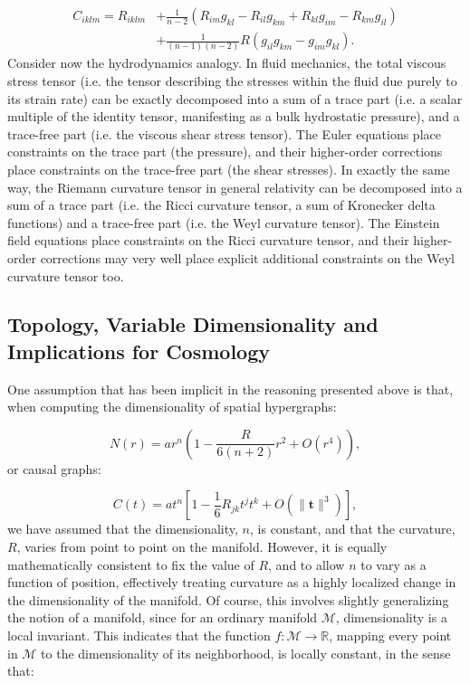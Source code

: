\documentclass{article}
\begin{document}
\begin{align}
C_{i k l m} = R_{i k l m} &+ \frac{1}{n - 2} \left( R_{i m} g_{k l} - R_{i l} g_{k m} + R_{k l} g_{i m} - R_{k m} g_{i l} \right)\\
&+ \frac{1}{\left( n - 1 \right) \left( n - 2 \right)} R \left( g_{i l} g_{k m} - g_{i m} g_{k l} \right).
\end{align}
Consider now the hydrodynamics analogy. In fluid mechanics, the total viscous stress tensor (i.e. the tensor describing the stresses within the fluid due purely to its strain rate) can be exactly decomposed into a sum of a trace part (i.e. a scalar multiple of the identity tensor, manifesting as a bulk hydrostatic pressure), and a trace-free part (i.e. the viscous shear stress tensor). The Euler equations place constraints on the trace part (the pressure), and their higher-order corrections place constraints on the trace-free part (the shear stresses). In exactly the same way, the Riemann curvature tensor in general relativity can be decomposed into a sum of a trace part (i.e. the Ricci curvature tensor, a sum of Kronecker delta functions) and a trace-free part (i.e. the Weyl curvature tensor). The Einstein field equations place constraints on the Ricci curvature tensor, and their higher-order corrections may very well place explicit additional constraints on the Weyl curvature tensor too.

\subsection{Topology, Variable Dimensionality and Implications for Cosmology}
\label{sec:CurrentStatus8}

One assumption that has been implicit in the reasoning presented above is that, when computing the dimensionality of spatial hypergraphs:

\begin{equation}
N \left( r \right) = a r^n \left( 1 - \frac{R}{6 \left( n + 2 \right)} r^2 + O \left( r^4 \right) \right),
\end{equation}
or causal graphs:

\begin{equation}
C \left( t \right) = a t ^n \left[ 1 - \frac{1}{6} R_{j k} t^j t^k + O \left( \lVert \mathbf{t} \rVert^3 \right) \right],
\end{equation}
we have assumed that the dimensionality, $n$, is constant, and that the curvature, $R$, varies from point to point on the manifold. However, it is equally mathematically consistent to fix the value of $R$, and to allow $n$ to vary as a function of position, effectively treating curvature as a highly localized change in the dimensionality of the manifold. Of course, this involves slightly generalizing the notion of a manifold, since for an ordinary manifold ${\mathcal{M}}$, dimensionality is a local invariant. This indicates that the function ${f : \mathcal{M} \to \mathbb{R}}$, mapping every point in ${\mathcal{M}}$ to the dimensionality of its neighborhood, is locally constant, in the sense that\cite{lee}:
\end{document}
